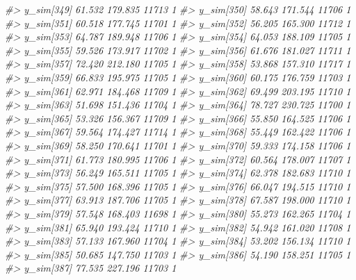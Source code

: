 \documentclass[
  10pt,
  italian,
  a4paper,
  extrafontsizes,onecolumn,openright
  ]{memoir}
\newenvironment{Shaded}{\begin{snugshade}}{\end{snugshade}}
\newcommand{\CommentTok}[1]{\textcolor[rgb]{0.56,0.35,0.01}{\textit{#1}}}
\begin{document}
\begin{Shaded}
\begin{Highlighting}[]
\CommentTok{\#\textgreater{} y\_sim[349] 61.532 179.835 11713    1}
\CommentTok{\#\textgreater{} y\_sim[350] 58.643 171.544 11706    1}
\CommentTok{\#\textgreater{} y\_sim[351] 60.518 177.745 11701    1}
\CommentTok{\#\textgreater{} y\_sim[352] 56.205 165.300 11712    1}
\CommentTok{\#\textgreater{} y\_sim[353] 64.787 189.948 11706    1}
\CommentTok{\#\textgreater{} y\_sim[354] 64.053 188.109 11705    1}
\CommentTok{\#\textgreater{} y\_sim[355] 59.526 173.917 11702    1}
\CommentTok{\#\textgreater{} y\_sim[356] 61.676 181.027 11711    1}
\CommentTok{\#\textgreater{} y\_sim[357] 72.420 212.180 11705    1}
\CommentTok{\#\textgreater{} y\_sim[358] 53.868 157.310 11717    1}
\CommentTok{\#\textgreater{} y\_sim[359] 66.833 195.975 11705    1}
\CommentTok{\#\textgreater{} y\_sim[360] 60.175 176.759 11703    1}
\CommentTok{\#\textgreater{} y\_sim[361] 62.971 184.468 11709    1}
\CommentTok{\#\textgreater{} y\_sim[362] 69.499 203.195 11710    1}
\CommentTok{\#\textgreater{} y\_sim[363] 51.698 151.436 11704    1}
\CommentTok{\#\textgreater{} y\_sim[364] 78.727 230.725 11700    1}
\CommentTok{\#\textgreater{} y\_sim[365] 53.326 156.367 11709    1}
\CommentTok{\#\textgreater{} y\_sim[366] 55.850 164.525 11706    1}
\CommentTok{\#\textgreater{} y\_sim[367] 59.564 174.427 11714    1}
\CommentTok{\#\textgreater{} y\_sim[368] 55.449 162.422 11706    1}
\CommentTok{\#\textgreater{} y\_sim[369] 58.250 170.641 11701    1}
\CommentTok{\#\textgreater{} y\_sim[370] 59.333 174.158 11706    1}
\CommentTok{\#\textgreater{} y\_sim[371] 61.773 180.995 11706    1}
\CommentTok{\#\textgreater{} y\_sim[372] 60.564 178.007 11707    1}
\CommentTok{\#\textgreater{} y\_sim[373] 56.249 165.511 11705    1}
\CommentTok{\#\textgreater{} y\_sim[374] 62.378 182.683 11710    1}
\CommentTok{\#\textgreater{} y\_sim[375] 57.500 168.396 11705    1}
\CommentTok{\#\textgreater{} y\_sim[376] 66.047 194.515 11710    1}
\CommentTok{\#\textgreater{} y\_sim[377] 63.913 187.706 11705    1}
\CommentTok{\#\textgreater{} y\_sim[378] 67.587 198.000 11710    1}
\CommentTok{\#\textgreater{} y\_sim[379] 57.548 168.403 11698    1}
\CommentTok{\#\textgreater{} y\_sim[380] 55.273 162.265 11704    1}
\CommentTok{\#\textgreater{} y\_sim[381] 65.940 193.424 11710    1}
\CommentTok{\#\textgreater{} y\_sim[382] 54.942 161.020 11708    1}
\CommentTok{\#\textgreater{} y\_sim[383] 57.133 167.960 11704    1}
\CommentTok{\#\textgreater{} y\_sim[384] 53.202 156.134 11710    1}
\CommentTok{\#\textgreater{} y\_sim[385] 50.685 147.750 11703    1}
\CommentTok{\#\textgreater{} y\_sim[386] 54.190 158.251 11705    1}
\CommentTok{\#\textgreater{} y\_sim[387] 77.535 227.196 11703    1}

\end{Highlighting}
\end{Shaded}
\end{document}
